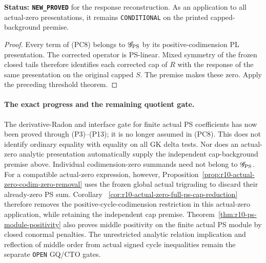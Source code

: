 \noindent\textbf{Status: \texttt{NEW\_PROVED}} for the
response reconstruction.  As an application to all
actual-zero presentations, it remains
\texttt{CONDITIONAL} on the printed capped-background
premise.

\begin{proof}
Every term of (PC8) belongs to
$\mathscr G_{\rm PS}$ by its positive-codimension PL
presentation.  The corrected operator is PS-linear.
Mixed symmetry of the frozen closed tails therefore
identifies each corrected cap of $R$ with the response
of the same presentation on the original capped $S$.
The premise makes these zero.  Apply the preceding
threshold theorem.
\end{proof}

\paragraph{The exact progress and the remaining quotient gate.}
The derivative-Radon and interface gate for finite actual PS
coefficients has now been proved through (P3)--(P13); it
is no longer assumed in (PC8).  This does not identify
ordinary equality with equality on all GK delta tests.
Nor does an actual-zero analytic presentation automatically
supply the independent cap-background premise above.
Individual codimension-zero summands need not belong to
$\mathscr G_{\rm PS}$.  For a compatible actual-zero expression,
however, Proposition~\ref{prop:r10-actual-zero-codim-zero-removal}
uses the frozen global actual trigrading to discard their
already-zero PS sum.  Corollary
~\ref{cor:r10-actual-zero-full-ps-cap-reduction} therefore removes
the positive-cycle-codimension restriction in this actual-zero
application, while retaining the independent cap premise.
Theorem~\ref{thm:r10-ps-module-positivity} also proves middle
positivity on the finite actual PS module by closed conormal
penalties.  The unrestricted analytic relation implication and
reflection of middle order from actual signed cycle inequalities
remain the separate \texttt{OPEN} GQ/CTO gates.

